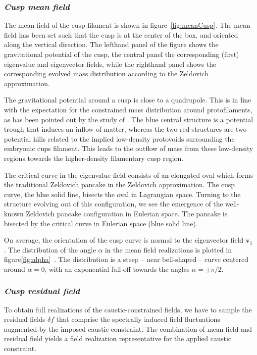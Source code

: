 \documentclass[a4paper, 11pt]{article}
\begin{document}
\subsubsection{{\it Cusp mean field}}
The mean field of the cusp filament is shown in figure~\ref{fig:meanCusp}. The mean field has been set such that the cusp is at the center of the box, and oriented along the vertical direction. The lefthand panel of the figure shows the gravitational potential of the cusp, the central panel the corresponding (first) eigenvalue and eigenvector fields, while the righthand panel shows the corresponding evolved mass distribution according to the Zeldovich approximation. 

The gravitational potential around a cusp is close to a quadrupole. This is in line with the expectation for the constrained mass distribution around protofilaments, as has been pointed out by the study of \cite{Weygaert:1996}. The blue central structure is a potential trough that induces an inflow of matter, whereas the two red structures are two potential hills related to the implied low-density protovoids surrounding the embryonic cups filament. This leads to the outflow of mass from these low-density regions towards the higher-density filamentary cusp region.

The critical curve in the eigenvalue field consists of an elongated oval which forms the traditional Zeldovich pancake in the Zeldovich approximation. The cusp curve, the blue solid line, bisects the oval in Lagrangian space. Turning to the structure evolving out of this configuration, we see the emergence of the well-known Zeldovich pancake configuration in Eulerian space. The pancake is bisected by the critical curve in Eulerian space (blue solid line).

On average, the orientation of the cusp curve is normal to the eigenvector field $\bm{v}_1$. The distribution of the angle $\alpha$ in the mean field realizations is plotted in figure\ref{fig:alpha}~. The distribution is a steep -- near bell-shaped -- curve centered around $\alpha=0$, with an exponential fall-off towards the angles $\alpha =\pm \pi/2$.

\subsubsection{{\it Cusp residual field}}
To obtain full realizations of the caustic-constrained fields, we have to sample the residual fields $\delta f$ that comprise the spectrally induced field fluctuations augmented by the imposed caustic constraint. The combination of mean field and residual field yields a field realization representative for the applied caustic constraint.
\end{document}
